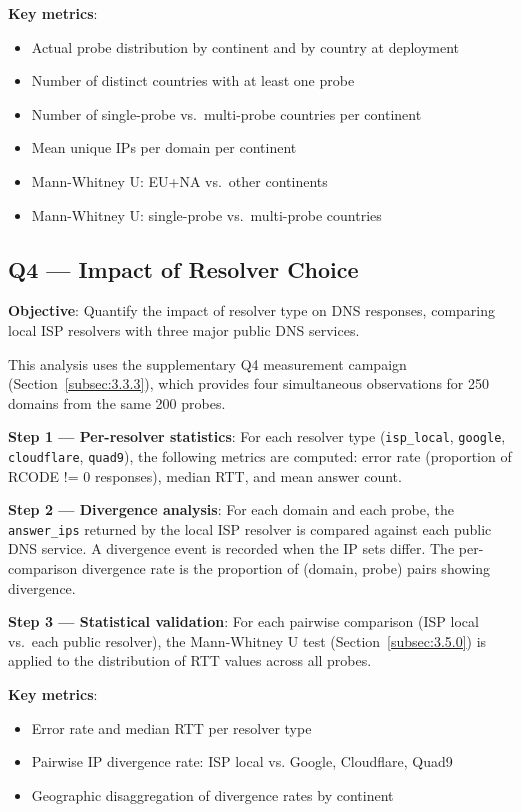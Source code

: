 \textbf{Key metrics}:
\begin{itemize}
  \item Actual probe distribution by continent and by country at deployment
  \item Number of distinct countries with at least one probe
  \item Number of single-probe vs.\ multi-probe countries per continent
  \item Mean unique \ac{IP}s per domain per continent
  \item Mann-Whitney U: EU+NA vs.\ other continents
  \item Mann-Whitney U: single-probe vs.\ multi-probe countries
\end{itemize}

\subsection{Q4 --- Impact of Resolver Choice}
\label{subsec:3.5.4}

\textbf{Objective}: Quantify the impact of resolver type on \ac{DNS} responses, comparing local \ac{ISP} resolvers with three major public \ac{DNS} services.

This analysis uses the supplementary Q4 measurement campaign (Section~\ref{subsec:3.3.3}), which provides four simultaneous observations for 250 domains from the same 200 probes.

\textbf{Step 1 --- Per-resolver statistics}: For each resolver type (\texttt{isp\_local}, \texttt{google}, \texttt{cloudflare}, \texttt{quad9}), the following metrics are computed: error rate (proportion of RCODE != 0 responses), median \ac{RTT}, and mean answer count.

\textbf{Step 2 --- Divergence analysis}: For each domain and each probe, the \texttt{answer\_ips} returned by the local \ac{ISP} resolver is compared against each public \ac{DNS} service. A divergence event is recorded when the \ac{IP} sets differ. The per-comparison divergence rate is the proportion of (domain, probe) pairs showing divergence.

\textbf{Step 3 --- Statistical validation}: For each pairwise comparison (\ac{ISP} local vs.\ each public resolver), the Mann-Whitney U test (Section~\ref{subsec:3.5.0}) is applied to the distribution of \ac{RTT} values across all probes.

\textbf{Key metrics}:
\begin{itemize}
  \item Error rate and median \ac{RTT} per resolver type
  \item Pairwise \ac{IP} divergence rate: \ac{ISP} local vs. Google, Cloudflare, Quad9
  \item Geographic disaggregation of divergence rates by continent
\end{itemize}

